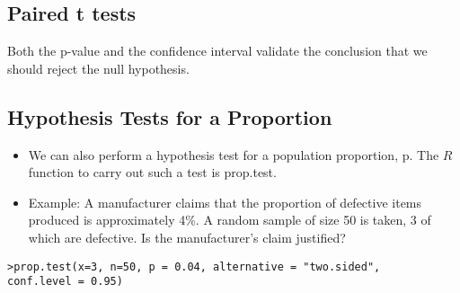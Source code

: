 \documentclass[a4paper,12pt]{article}
\begin{document}
\subsection{Paired t tests}
Both the p-value and the confidence interval validate the conclusion that we should reject the null hypothesis.



\subsection{Hypothesis Tests for a Proportion }
\begin{itemize}
\item We can also perform a hypothesis test for a population
proportion, p. The $R$ function to carry out such a test is
prop.test.

\item Example: A manufacturer claims that the proportion of
defective items produced is approximately 4\%. A random sample of
size 50 is taken, 3 of which are defective. Is the manufacturer's
claim justified?
\end{itemize}
\begin{verbatim}
>prop.test(x=3, n=50, p = 0.04, alternative = "two.sided",
conf.level = 0.95)
\end{verbatim}
\end{document}
